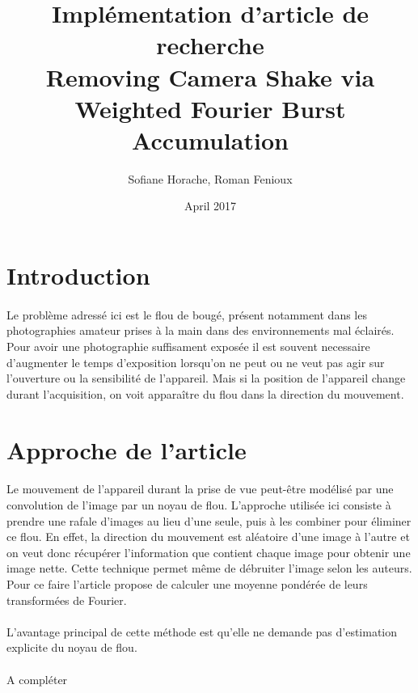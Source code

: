 \documentclass[a4paper,10pt]{report}
\title{Implémentation d'article de recherche \\ 
Removing Camera Shake via Weighted Fourier Burst Accumulation}
\author{Sofiane Horache, Roman Fenioux}
\date{April 2017}
\begin{document}
\maketitle

\setcounter{secnumdepth}{0}

\section{Introduction}
\paragraph{}
Le problème adressé ici est le flou de bougé, présent notamment dans les photographies 
amateur prises à la main dans des environnements mal éclairés. Pour avoir une photographie 
suffisament exposée il est souvent necessaire d'augmenter le temps d'exposition lorsqu'on 
ne peut ou ne veut pas agir sur l'ouverture ou la sensibilité de l'appareil. Mais si la 
position de l'appareil change durant l'acquisition, on voit apparaître du flou dans la direction
du mouvement. 

\section{Approche de l'article}
\paragraph{}
Le mouvement de l'appareil durant la prise de vue peut-être modélisé par une convolution de l'image
par un noyau de flou. L'approche utilisée ici consiste à prendre une rafale d'images au lieu 
d'une seule, puis à les combiner pour éliminer ce flou. En effet, la direction du mouvement est 
aléatoire d'une image à l'autre et on veut donc récupérer l'information que contient chaque image
pour obtenir une image nette. Cette technique permet même de débruiter l'image selon les
auteurs. Pour ce faire l'article propose de calculer une moyenne pondérée de leurs transformées 
de Fourier. 

\paragraph{}
L'avantage principal de cette méthode est qu'elle ne demande pas d'estimation explicite du noyau 
de flou. 
\\
\\
A compléter
\end{document}
